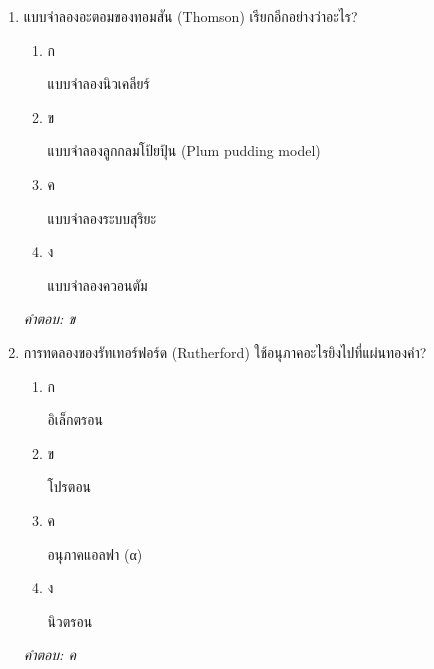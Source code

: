 \documentclass[12pt]{article}
\begin{document}
\begin{enumerate}[label=\arabic*., itemsep=0.5\baselineskip, topsep=0.5\baselineskip, leftmargin=*]
\item แบบจำลองอะตอมของทอมสัน (Thomson) เรียกอีกอย่างว่าอะไร?
\begin{enumerate}[label=\alph*)., itemsep=0.3\baselineskip, topsep=0.3\baselineskip]
\item ก\ 
\begin{minipage}[t]{0.9\linewidth}
\raggedright แบบจำลองนิวเคลียร์
\end{minipage}
\item ข\ 
\begin{minipage}[t]{0.9\linewidth}
\raggedright แบบจำลองลูกกลมโป้ยปุ้น (Plum pudding model)
\end{minipage}
\item ค\ 
\begin{minipage}[t]{0.9\linewidth}
\raggedright แบบจำลองระบบสุริยะ
\end{minipage}
\item ง\ 
\begin{minipage}[t]{0.9\linewidth}
\raggedright แบบจำลองควอนตัม
\end{minipage}
\end{enumerate}
\vspace{-0.3\baselineskip}
\begin{small}
\textit{คำตอบ: ข}
\end{small}

\item การทดลองของรัทเทอร์ฟอร์ด (Rutherford) ใช้อนุภาคอะไรยิงไปที่แผ่นทองคำ?
\begin{enumerate}[label=\alph*)., itemsep=0.3\baselineskip, topsep=0.3\baselineskip]
\item ก\ 
\begin{minipage}[t]{0.9\linewidth}
\raggedright อิเล็กตรอน
\end{minipage}
\item ข\ 
\begin{minipage}[t]{0.9\linewidth}
\raggedright โปรตอน
\end{minipage}
\item ค\ 
\begin{minipage}[t]{0.9\linewidth}
\raggedright อนุภาคแอลฟา (α)
\end{minipage}
\item ง\ 
\begin{minipage}[t]{0.9\linewidth}
\raggedright นิวตรอน
\end{minipage}
\end{enumerate}
\vspace{-0.3\baselineskip}
\begin{small}
\textit{คำตอบ: ค}
\end{small}


\end{enumerate}
\end{document}
